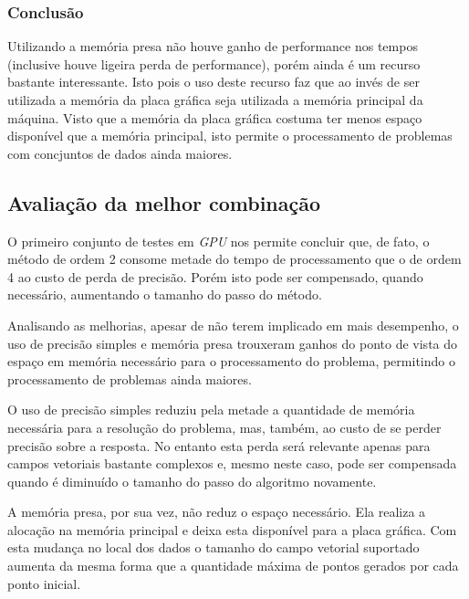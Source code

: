     \subsubsection{Conclusão}
    Utilizando a memória presa não houve ganho de performance nos tempos (inclusive houve ligeira perda de performance), porém ainda é um recurso bastante interessante. Isto pois o uso deste recurso faz que ao invés de ser utilizada a memória da placa gráfica seja utilizada a memória principal da máquina. Visto que a memória da placa gráfica costuma ter menos espaço disponível que a memória principal, isto permite o processamento de problemas com concjuntos de dados ainda maiores.
  
  
  \subsection{Avaliação da melhor combinação}
  O primeiro conjunto de testes em \textit{GPU} nos permite concluir que, de fato, o método de ordem 2 consome metade do tempo de processamento que o de ordem 4 ao custo de perda de precisão. Porém isto pode ser compensado, quando necessário, aumentando o tamanho do passo do método.
  
  Analisando as melhorias, apesar de  não terem implicado em mais desempenho, o uso de precisão simples e memória presa trouxeram ganhos do ponto de vista do espaço em memória necessário para o processamento do problema, permitindo o processamento de problemas ainda maiores.
  
  O uso de precisão simples reduziu pela metade a quantidade de memória necessária para a resolução do problema, mas, também, ao custo de se perder precisão sobre a resposta. No entanto esta perda será relevante apenas para campos vetoriais bastante complexos e, mesmo neste caso, pode ser compensada quando é diminuído o tamanho do passo do algoritmo novamente.
  
  A memória presa, por sua vez, não reduz o espaço necessário. Ela realiza a alocação na memória principal e deixa esta disponível para a placa gráfica. Com esta mudança no local dos dados o tamanho do campo vetorial suportado aumenta da mesma forma que a quantidade máxima de pontos gerados por cada ponto inicial.
